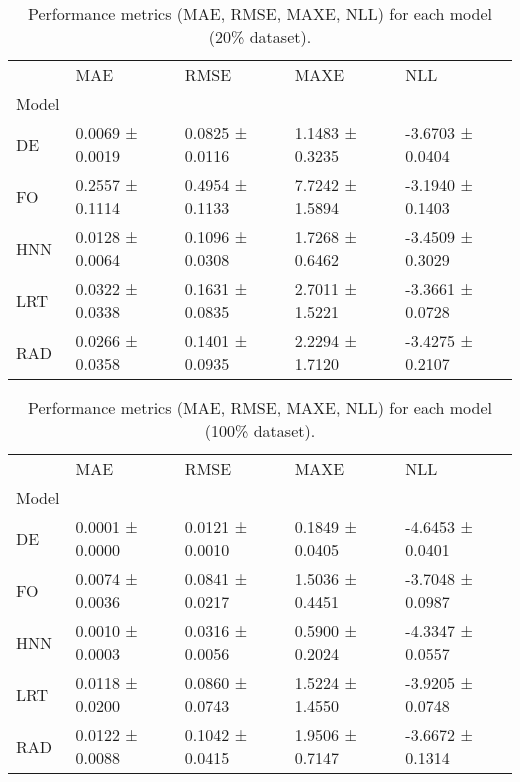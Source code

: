 \begin{table}
\caption{Performance metrics (MAE, RMSE, MAXE, NLL) for each model (20\% dataset).}
\label{tab:performance_20}
\begin{tabular}{lllll}
\toprule
 & MAE & RMSE & MAXE & NLL \\
Model &  &  &  &  \\
\midrule
DE & 0.0069 ± 0.0019 & 0.0825 ± 0.0116 & 1.1483 ± 0.3235 & -3.6703 ± 0.0404 \\
FO & 0.2557 ± 0.1114 & 0.4954 ± 0.1133 & 7.7242 ± 1.5894 & -3.1940 ± 0.1403 \\
HNN & 0.0128 ± 0.0064 & 0.1096 ± 0.0308 & 1.7268 ± 0.6462 & -3.4509 ± 0.3029 \\
LRT & 0.0322 ± 0.0338 & 0.1631 ± 0.0835 & 2.7011 ± 1.5221 & -3.3661 ± 0.0728 \\
RAD & 0.0266 ± 0.0358 & 0.1401 ± 0.0935 & 2.2294 ± 1.7120 & -3.4275 ± 0.2107 \\
\bottomrule
\end{tabular}
\end{table}


\begin{table}
\caption{Performance metrics (MAE, RMSE, MAXE, NLL) for each model (100\% dataset).}
\label{tab:performance_100}
\begin{tabular}{lllll}
\toprule
 & MAE & RMSE & MAXE & NLL \\
Model &  &  &  &  \\
\midrule
DE & 0.0001 ± 0.0000 & 0.0121 ± 0.0010 & 0.1849 ± 0.0405 & -4.6453 ± 0.0401 \\
FO & 0.0074 ± 0.0036 & 0.0841 ± 0.0217 & 1.5036 ± 0.4451 & -3.7048 ± 0.0987 \\
HNN & 0.0010 ± 0.0003 & 0.0316 ± 0.0056 & 0.5900 ± 0.2024 & -4.3347 ± 0.0557 \\
LRT & 0.0118 ± 0.0200 & 0.0860 ± 0.0743 & 1.5224 ± 1.4550 & -3.9205 ± 0.0748 \\
RAD & 0.0122 ± 0.0088 & 0.1042 ± 0.0415 & 1.9506 ± 0.7147 & -3.6672 ± 0.1314 \\
\bottomrule
\end{tabular}
\end{table}


